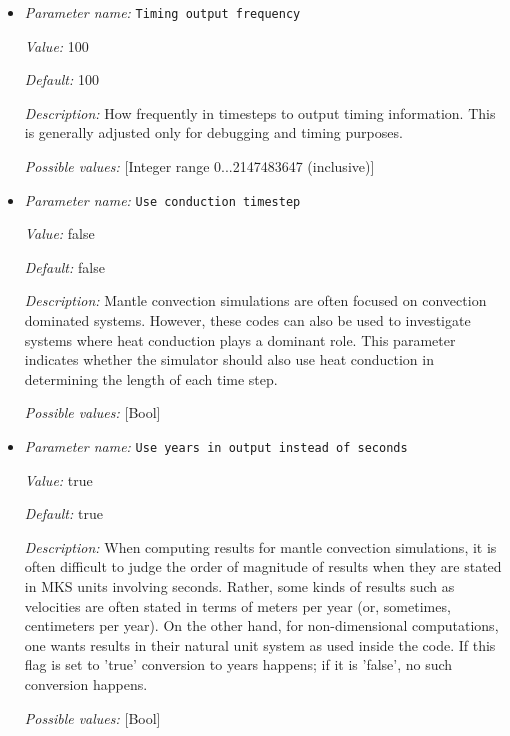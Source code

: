 \begin{itemize}
{\it Value:} 1e-7


{\it Default:} 1e-12


{\it Description:} The relative tolerance up to which the linear system for the temperature system gets solved. See 'linear solver tolerance' for more details.


{\it Possible values:} [Double 0...1 (inclusive)]
\item {\it Parameter name:} {\tt Timing output frequency}


{\it Value:} 100


{\it Default:} 100


{\it Description:} How frequently in timesteps to output timing information. This is generally adjusted only for debugging and timing purposes.


{\it Possible values:} [Integer range 0...2147483647 (inclusive)]
\item {\it Parameter name:} {\tt Use conduction timestep}


{\it Value:} false


{\it Default:} false


{\it Description:} Mantle convection simulations are often focused on convection dominated systems. However, these codes can also be used to investigate systems where heat conduction plays a dominant role. This parameter indicates whether the simulator should also use heat conduction in determining the length of each time step.


{\it Possible values:} [Bool]
\item {\it Parameter name:} {\tt Use years in output instead of seconds}


{\it Value:} true


{\it Default:} true


{\it Description:} When computing results for mantle convection simulations, it is often difficult to judge the order of magnitude of results when they are stated in MKS units involving seconds. Rather, some kinds of results such as velocities are often stated in terms of meters per year (or, sometimes, centimeters per year). On the other hand, for non-dimensional computations, one wants results in their natural unit system as used inside the code. If this flag is set to 'true' conversion to years happens; if it is 'false', no such conversion happens.


{\it Possible values:} [Bool]
\end{itemize}



